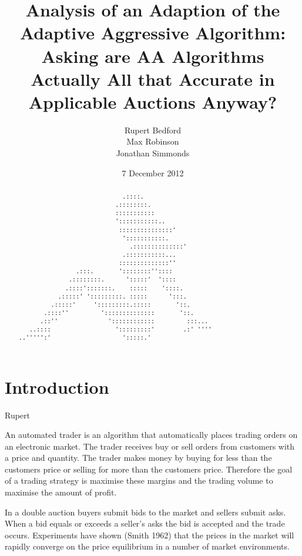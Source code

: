 \documentclass{acm_proc_article-sp}
\begin{document}
\title{Analysis of an Adaption of the Adaptive Aggressive Algorithm: Asking are AA Algorithms Actually All that Accurate in Applicable Auctions Anyway?}
\author{
  \alignauthor
    Rupert Bedford\\
  \alignauthor
    Max Robinson\\
  \alignauthor
    Jonathan Simmonds
}
\date{7 December 2012}

\maketitle
\begin{abstract} \label{sec:abstract}
\begin{verbatim}
                             .::::. 
                           .::::::::. 
                           ::::::::::: 
                           ':::::::::::.. 
                            :::::::::::::::' 
                             ':::::::::::. 
                               .::::::::::::::' 
                             .:::::::::::... 
                            ::::::::::::::'' 
                .:::.       '::::::::'':::: 
              .::::::::.      ':::::'  ':::: 
             .::::':::::::.    :::::    '::::. 
           .:::::' ':::::::::. :::::      ':::. 
         .:::::'     ':::::::::.:::::       '::. 
       .::::''         '::::::::::::::       '::. 
      .::''              '::::::::::::         :::... 
   ..::::                  ':::::::::'        .:' '''' 
..''''':'                    ':::::.' 
\end{verbatim}
\end{abstract}

\pagebreak

\section{Introduction} \label{sec:introduction}
Rupert

An automated trader is an algorithm that automatically places trading orders on
an electronic market.
The trader receives buy or sell orders from customers with a price and
quantity.
The trader makes money by buying for less than the customers price or selling
for more than the customers price.
Therefore the goal of a trading strategy is maximise these margins and the
trading volume to maximise the amount of profit.

In a double auction buyers submit bids to the market and sellers submit asks.
When a bid equals or exceeds a seller's asks the bid is accepted and the trade
occurs. Experiments have shown (Smith 1962) that the prices in the market will
rapidly converge on the price equilibrium in a number of market environments.
\end{document}
